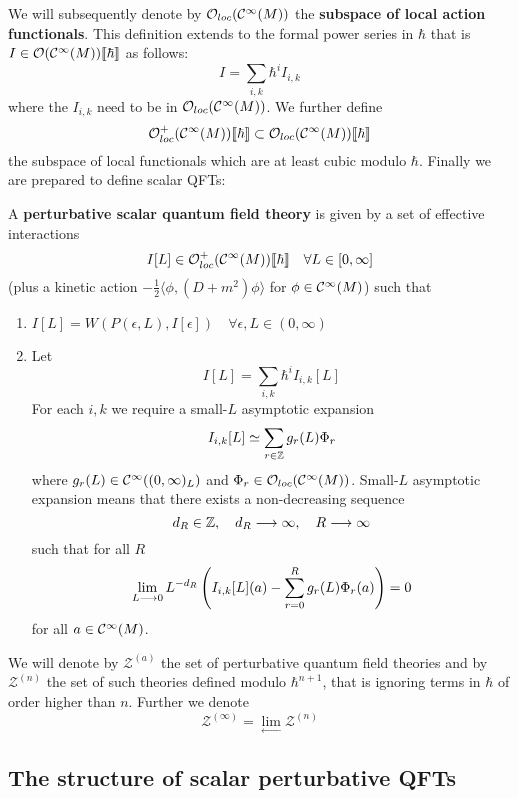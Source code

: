 We will subsequently denote by $\mathcal{O}_{loc}(\mathcal{C}^{\infty}(M))$ the \textbf{subspace of local action functionals}. This definition extends to the formal power series in $\hbar$ that is $I \in \mathcal{O}(\mathcal{C}^{\infty}(M))\llbracket \hbar \rrbracket$ as follows:
$$ I = \sum_{i,k} \hbar^i I_{i,k} $$
where the $I_{i,k}$ need to be in $\mathcal{O}_{loc}(\mathcal{C}^{\infty}(M))$. We further define
$$ \mathcal{O}^+_{loc}(\mathcal{C}^{\infty}(M))\llbracket \hbar \rrbracket \subset \mathcal{O}_{loc}(\mathcal{C}^{\infty}(M))\llbracket \hbar \rrbracket $$
the subspace of local functionals which are at least cubic modulo $\hbar$. Finally we are prepared to define scalar QFTs:

\begin{definition}
\label{def:PSQFTs}
  A \textbf{perturbative scalar quantum field theory} is given by a set of effective interactions
  $$ I[L] \in \mathcal{O}^+_{loc}(\mathcal{C}^{\infty}(M))\llbracket \hbar \rrbracket \quad \forall L \in [0, \infty] $$
  (plus a kinetic action $- \frac{1}{2} \langle \phi, (D + m^2) \phi \rangle$ for $\phi \in \Ci(M)$) such that
  \begin{enumerate}
    \item $I[L] = W(P(\epsilon, L), I[\epsilon]) \quad \forall \epsilon,L \in (0,\infty)$

    \item Let
    $$ I[L] = \sum_{i,k} \hbar^i I_{i,k}[L] $$
    For each $i,k$ we require a small-$L$ asymptotic expansion
    $$ I_{i,k}[L] \simeq \sum_{r \in \mathbb{Z}} g_r(L) \Phi_r $$
    where $g_r(L) \in \mathcal{C}^{\infty}((0,\infty)_L)$ and $\Phi_r \in \mathcal{O}_{loc}(\mathcal{C}^{\infty}(M))$. Small-$L$ asymptotic expansion means that there exists a non-decreasing sequence
    $$ d_R \in \mathbb{Z}, \quad d_R \longrightarrow \infty, \quad R\longrightarrow \infty $$
    such that for all $R$
    $$ \lim_{L \longrightarrow 0} L^{-d_R} \left( I_{i,k}[L](a) - \sum_{r=0}^R g_r(L) \Phi_r(a) \right) = 0 $$
    for all $a \in \mathcal{C}^{\infty}(M)$.
  \end{enumerate}
  We will denote by $\mathcal{Z}^{(a)}$ the set of perturbative quantum field theories and by $\mathcal{Z}^{(n)}$ the set of such theories defined modulo $\hbar^{n+1}$, that is ignoring terms in $\hbar$ of order higher than $n$. Further we denote
  $$ \mathcal{Z}^{(\infty)} = \lim_{\longleftarrow} \mathcal{Z}^{(n)} $$
\end{definition}

\subsection{The structure of scalar perturbative QFTs}


